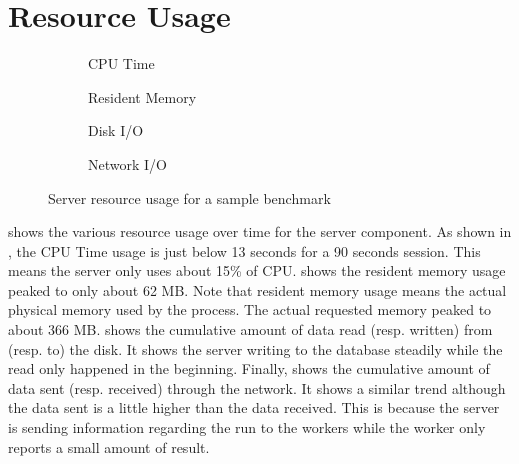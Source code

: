 \section{Resource Usage}
\label{sec:eval.resource}

\begin{figure}
	\centering

	\begin{subfigure}{.45\textwidth}
		\centering
		\caption{CPU Time}
		\label{fig:eval.perf.cpu}
	\end{subfigure}%
	\hfill%
	\begin{subfigure}{.45\textwidth}
		\centering
		\caption{Resident Memory}
		\label{fig:eval.perf.rss}
	\end{subfigure}

	\vspace{1cm}

	\begin{subfigure}{.45\textwidth}
		\centering
		\caption{Disk I/O}
		\label{fig:eval.perf.disk}
	\end{subfigure}%
	\hfill%
	\begin{subfigure}{.45\textwidth}
		\centering
		\caption{Network I/O}
		\label{fig:eval.perf.network}
	\end{subfigure}

	\caption{Server resource usage for a sample benchmark}
	\label{fig:eval.perf}
\end{figure}


 shows the various resource usage over time for the server component.
As shown in , the CPU Time usage is just below 13 seconds for a 90 seconds session.
This means the server only uses about 15\% of CPU.
 shows the resident memory usage peaked to only about 62 MB.
Note that resident memory usage means the actual physical memory used by the process.
The actual requested memory peaked to about 366 MB.
 shows the cumulative amount of data read (resp. written) from (resp. to) the disk.
It shows the server writing to the database steadily while the read only happened in the beginning.
Finally,  shows the cumulative amount of data sent (resp. received) through the network.
It shows a similar trend although the data sent is a little higher than the data received.
This is because the server is sending information regarding the run to the workers while the worker only reports a small amount of result.

